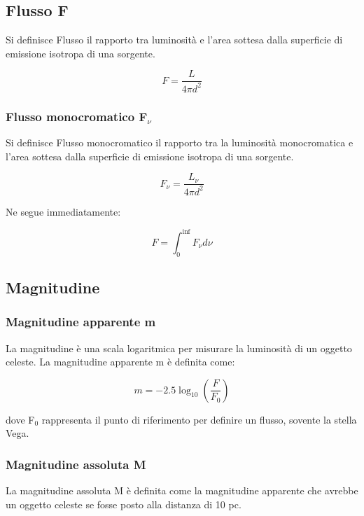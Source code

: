 \documentclass{article}
\begin{document}
\subsection{Flusso F}
Si definisce Flusso il rapporto tra luminosità e l'area sottesa dalla superficie di emissione isotropa di una sorgente.

\begin{equation}
    F = \frac{L}{4\pi d^2}
\end{equation}

\subsubsection{Flusso monocromatico F$_{\nu}$}

Si definisce Flusso monocromatico il rapporto tra la luminosità monocromatica e l'area sottesa dalla superficie di emissione isotropa di una sorgente.

\begin{equation}
    F_{\nu} = \frac{L_{\nu}}{4\pi d^2}
\end{equation}

Ne segue immediatamente:

\begin{equation}
    F= \int_0^{\inf} F_{\nu}d\nu
\end{equation}

\subsection{Magnitudine}
\subsubsection{Magnitudine apparente m}
La magnitudine è una scala logaritmica per misurare la luminosità di un oggetto celeste.
La magnitudine apparente m è definita come:

\begin{equation}
    m = -2.5 \log_{10}(\frac{F}{F_0})
\end{equation}

dove F$_0$ rappresenta il punto di riferimento per definire un flusso, sovente la stella Vega.

\subsubsection{Magnitudine assoluta M}

La magnitudine assoluta M è definita come la magnitudine apparente che avrebbe un oggetto celeste se fosse posto alla distanza di 10 pc.
\end{document}
